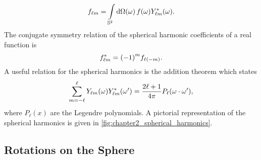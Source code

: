 %
\begin{equation}
    \harmonic{f}
    = \integrateSphere{\omega} \pixel{f} \pixel{\conj{\harmonic{Y}}}.
\end{equation}
%
The conjugate symmetry relation of the spherical harmonic coefficients of a real function is
%
\begin{equation}
    \conj{\harmonic{f}}
    = \phaseFactor f_{\ell(-m)}.
\end{equation}
%
A useful relation for the spherical harmonics is the addition theorem which states
%
\begin{equation}\label{eq:chapter2_addition_theorem}
    \sum\limits_{m=-\ell}^{\ell} \pixel{\harmonic{Y}} \pixel[']{\conj{\harmonic{Y}}}
    = \factor P_{\ell}(\omega \cdot \omega'),
\end{equation}
%
where \(P_{\ell}(x)\) are the Legendre polynomials.
A pictorial representation of the spherical harmonics is given in \cref{fig:chapter2_spherical_harmonics}.



\subsection{Rotations on the Sphere}\label{sec:chapter2_rotations_sphere}


